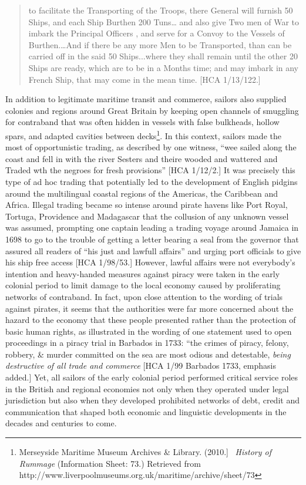 \documentclass[12pt]{article}
\newenvironment{styleStandard}{\renewcommand\baselinestretch{1.0}\setlength\leftskip{0cm}\setlength\rightskip{0cm plus 1fil}\setlength\parindent{0cm}\setlength\parfillskip{0pt plus 1fil}\setlength\parskip{0in plus 1pt}\writerlistparindent\writerlistleftskip\leavevmode\normalfont\normalsize\writerlistlabel\ignorespaces}{\unskip\vspace{0in plus 1pt}\par}
\newcommand\writerlistleftskip{}
\newcommand\writerlistparindent{}
\newcommand\writerlistlabel{}
\begin{document}
\begin{quotation}
to facilitate the Transporting of the Troops, there General will furnish 50 Ships, and each Ship Burthen 200 Tuns… and also give Two men of War to imbark the Principal Officers , and serve for a Convoy to the Vessels of Burthen.…And if there be any more Men to be Transported, than can be carried off in the said 50 Ships...where they shall remain until the other 20 Ships are ready, which are to be in a Months time; and may imbark in any French Ship, that may come in the mean time. [HCA 1/13/122.]

\end{quotation}
\begin{styleStandard}
In addition to legitimate maritime transit and commerce, sailors also supplied colonies and regions around Great Britain by keeping open channels of smuggling for contraband that was often hidden in vessels with false bulkheads, hollow spars, and adapted cavities between decks\footnote{ Merseyside Maritime Museum Archives \& Library. (2010.] \ \textit{History of Rummage} (Information Sheet: 73.) Retrieved from http://www.liverpoolmuseums.org.uk/maritime/archive/sheet/73}. In this context, sailors made the most of opportunistic trading, as described by one witness, “wee sailed along the coast and fell in with the river Sesters and theire wooded and wattered and Traded wth the negroes for fresh provisions” [HCA 1/12/2.] It was precisely this type of ad hoc trading that potentially led to the development of English pidgins around the multilingual coastal regions of the Americas, the Caribbean and Africa. Illegal trading became so intense around pirate havens like Port Royal, Tortuga, Providence and Madagascar that the collusion of any unknown vessel was assumed, prompting one captain leading a trading voyage around Jamaica in 1698 to go to the trouble of getting a letter bearing a seal from the governor that assured all readers of “his just and lawfull affairs” and urging port officials to give his ship free access [HCA 1/98/53.] However, lawful affairs were not everybody’s intention and heavy-handed measures against piracy were taken in the early colonial period to limit damage to the local economy caused by proliferating networks of contraband. In fact, upon close attention to the wording of trials against pirates, it seems that the authorities were far more concerned about the hazard to the economy that these people presented rather than the protection of basic human rights, as illustrated in the wording of one statement used to open proceedings in a piracy trial in Barbados in 1733: “the crimes of piracy, felony, robbery, \& murder committed on the sea are most odious and detestable, \textit{being destructive of all trade and commerce}{\textquotedbl} [HCA 1/99 Barbados 1733, emphasis added.] Yet, all sailors of the early colonial period performed critical service roles in the British and regional economies not only when they operated under legal jurisdiction but also when they developed prohibited networks of debt, credit and communication that shaped both economic and linguistic developments in the decades and centuries to come. 
\end{styleStandard}
\end{document}

